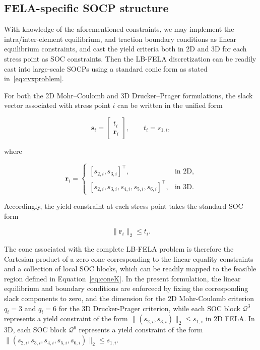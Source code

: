 \subsection{FELA-specific SOCP structure}

With knowledge of the aforementioned constraints, we may implement the intra/inter-element equilibrium, and traction boundary conditions as linear equilibrium constraints, and cast the yield criteria both in 2D and 3D for each stress point as SOC constraints. Then the LB-FELA discretization can be readily cast into large-scale SOCPs using a standard conic form as stated in~\ref{eq:cvxproblem}.

For both the 2D Mohr--Coulomb and 3D Drucker--Prager formulations, the slack vector associated with stress point $i$ can be written in the unified form

\begin{equation}
\boldsymbol{s}_i =
\begin{bmatrix}
t_i \\
\boldsymbol{r}_i
\end{bmatrix},
\qquad
t_i=s_{1,i},
\label{eq:soc_partition}
\end{equation}

where

\begin{equation}
\boldsymbol{r}_i =
\begin{cases}
[s_{2,i},s_{3,i}]^\top, & \text{in 2D},\\[1mm]
[s_{2,i},s_{3,i},s_{4,i},s_{5,i},s_{6,i}]^\top, & \text{in 3D}.
\end{cases}
\end{equation}

Accordingly, the yield constraint at each stress point takes the standard SOC form

\begin{equation}
\|\boldsymbol{r}_i\|_2 \leq t_i.
\label{eq:general_conic}
\end{equation}

The cone associated with the complete LB-FELA problem is therefore the Cartesian product of a zero cone corresponding to the linear equality constraints and a collection of local SOC blocks, which can be readily mapped to the feasible region defined in Equation~\eqref{eq:coneK}. In the present formulation, the linear equilibrium and boundary conditions are enforcecd by fixing the corresponding slack components to zero, and the dimension for the 2D Mohr-Coulomb criterion $q_i=3$ and $q_i=6$ for the 3D Drucker-Prager criterion, while each SOC block $\mathcal{Q}^{3}$ represents a yield constraint of the form $\|(s_{2,i},s_{3,i})\|_2 \le s_{1,i}$ in 2D FELA. In 3D, each SOC block $\mathcal{Q}^{6}$ represents a yield constraint of the form $\|(s_{2,i},s_{3,i},s_{4,i},s_{5,i},s_{6,i})\|_2 \le s_{1,i}$.



